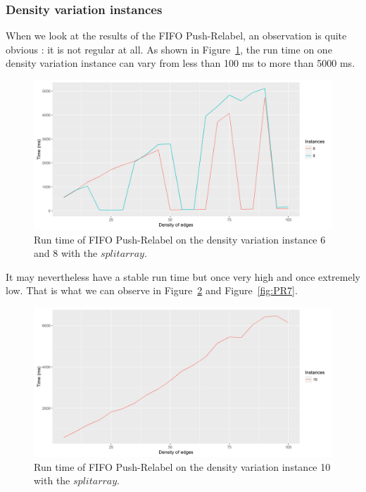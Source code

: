 \subsubsection{Density variation instances}
When we look at the results of the FIFO Push-Relabel, an observation is quite obvious : it is not regular at all. As shown in Figure~\ref{fig:PR6}, the run time on one density variation instance can vary from less than 100 ms to more than 5000 ms.
\begin{figure}[H]
\begin{center}
\includegraphics[scale=0.45]{images/results/pri68.png}
\caption{Run time of FIFO Push-Relabel on the density variation instance 6 and 8 with the $split array$.}
\label{fig:PR6}
\end{center}
\end{figure}
It may nevertheless have a stable run time but once very high and once extremely low. That is what we can observe in Figure~\ref{fig:PR10} and Figure~\ref{fig:PR7}.
\begin{figure}[H]
\begin{center}
\includegraphics[scale=0.45]{images/results/pri10.png}
\caption{Run time of FIFO Push-Relabel on the density variation instance 10 with the $split array$.}
\label{fig:PR10}
\end{center}
\end{figure}
